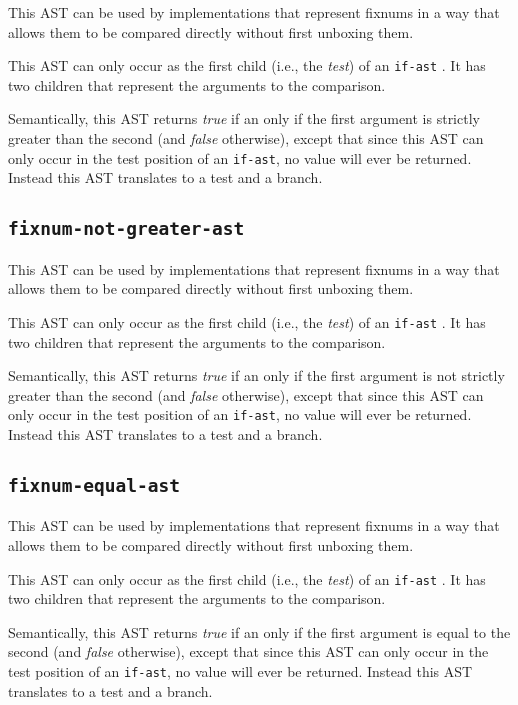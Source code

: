 This AST can be used by implementations that represent fixnums in a
way that allows them to be compared directly without first unboxing
them.

This AST can only occur as the first child (i.e., the \emph{test}) of
an \texttt{if-ast} .  It has two children that
represent the arguments to the comparison.  

Semantically, this AST returns \emph{true} if an only if the first
argument is strictly greater than the second (and \emph{false}
otherwise), except that since this AST can only occur in the test
position of an \texttt{if-ast}, no value will ever be returned.
Instead this AST translates to a test and a branch. 

\subsection{\texttt{fixnum-not-greater-ast}}
\label{fixnum-not-greater-ast}

This AST can be used by implementations that represent fixnums in a
way that allows them to be compared directly without first unboxing
them.

This AST can only occur as the first child (i.e., the \emph{test}) of
an \texttt{if-ast} .  It has two children that
represent the arguments to the comparison.  

Semantically, this AST returns \emph{true} if an only if the first
argument is not strictly greater than the second (and \emph{false}
otherwise), except that since this AST can only occur in the test
position of an \texttt{if-ast}, no value will ever be returned.
Instead this AST translates to a test and a branch. 

\subsection{\texttt{fixnum-equal-ast}}
\label{fixnum-equal-ast}

This AST can be used by implementations that represent fixnums in a
way that allows them to be compared directly without first unboxing
them.

This AST can only occur as the first child (i.e., the \emph{test}) of
an \texttt{if-ast} .  It has two children that
represent the arguments to the comparison.  

Semantically, this AST returns \emph{true} if an only if the first
argument is equal to the second (and \emph{false} otherwise), except
that since this AST can only occur in the test position of an
\texttt{if-ast}, no value will ever be returned.  Instead this AST
translates to a test and a branch.

